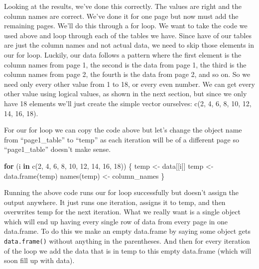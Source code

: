 \documentclass[
]{krantz}
\makeatletter
\newenvironment{Shaded}{\begin{snugshade}}{\end{snugshade}}
\newcommand{\ControlFlowTok}[1]{\textcolor[rgb]{0.27,0.27,0.27}{\textbf{#1}}}
\newcommand{\DecValTok}[1]{\textcolor[rgb]{0.06,0.06,0.06}{#1}}
\newcommand{\FunctionTok}[1]{\textcolor[rgb]{0,0,0}{#1}}
\newcommand{\NormalTok}[1]{#1}
\newcommand{\OtherTok}[1]{\textcolor[rgb]{0.37,0.37,0.37}{#1}}
\newenvironment{kframe}{%
\medskip{}
\setlength{\fboxsep}{.8em}
 \def\at@end@of@kframe{}%
 \ifinner\ifhmode%
  \def\at@end@of@kframe{\end{minipage}}%
  \begin{minipage}{\columnwidth}%
 \fi\fi%
 \def\FrameCommand##1{\hskip\@totalleftmargin \hskip-\fboxsep
 \colorbox{shadecolor}{##1}\hskip-\fboxsep
     \hskip-\linewidth \hskip-\@totalleftmargin \hskip\columnwidth}%
 \MakeFramed {\advance\hsize-\width
   \@totalleftmargin\z@ \linewidth\hsize
   \@setminipage}}%
 {\par\unskip\endMakeFramed%
 \at@end@of@kframe}
\renewenvironment{Shaded}{\begin{kframe}}{\end{kframe}}
\makeatother
\begin{document}
Looking at the results, we've done this correctly. The values are right and the column names are correct. We've done it for one page but now must add the remaining pages. We'll do this through a for loop. We want to take the code we used above and loop through each of the tables we have. Since have of our tables are just the column names and not actual data, we need to skip those elements in our for loop. Luckily, our data follows a pattern where the first element is the column names from page 1, the second is the data from page 1, the third is the column names from page 2, the fourth is the data from page 2, and so on. So we need only every other value from 1 to 18, or every even number. We can get every other value using logical values, as shown in the next section, but since we only have 18 elements we'll just create the simple vector ourselves: c(2, 4, 6, 8, 10, 12, 14, 16, 18).

For our for loop we can copy the code above but let's change the object name from ``page1\_table'' to ``temp'' as each iteration will be of a different page so ``page1\_table'' doesn't make sense.

\begin{Shaded}
\begin{Highlighting}[]
\ControlFlowTok{for}\NormalTok{ (i }\ControlFlowTok{in} \FunctionTok{c}\NormalTok{(}\DecValTok{2}\NormalTok{, }\DecValTok{4}\NormalTok{, }\DecValTok{6}\NormalTok{, }\DecValTok{8}\NormalTok{, }\DecValTok{10}\NormalTok{, }\DecValTok{12}\NormalTok{, }\DecValTok{14}\NormalTok{, }\DecValTok{16}\NormalTok{, }\DecValTok{18}\NormalTok{)) \{}
\NormalTok{  temp        }\OtherTok{\textless{}{-}}\NormalTok{ data[[i]]}
\NormalTok{  temp        }\OtherTok{\textless{}{-}} \FunctionTok{data.frame}\NormalTok{(temp)}
  \FunctionTok{names}\NormalTok{(temp) }\OtherTok{\textless{}{-}}\NormalTok{ column\_names}
\NormalTok{\}}
\end{Highlighting}
\end{Shaded}

Running the above code runs our for loop successfully but doesn't assign the output anywhere. It just runs one iteration, assigns it to temp, and then overwrites temp for the next iteration. What we really want is a single object which will end up having every single row of data from every page in one data.frame. To do this we make an empty data.frame by saying some object gets \texttt{data.frame()} without anything in the parentheses. And then for every iteration of the loop we add the data that is in temp to this empty data.frame (which will soon fill up with data).
\end{document}
